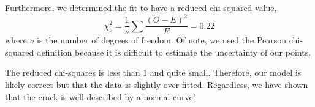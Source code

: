 \documentclass{article}
\begin{document}
Furthermore, we determined the fit to have a reduced chi-squared value,
\begin{equation}
    \chi^{2}_{\nu} = \frac{1}{\nu}\sum{\frac{(O-E)^2}{E}} = 0.22
\end{equation}
where $\nu$ is the number of degrees of freedom. Of note, we used the Pearson chi-squared definition because it is difficult to estimate the uncertainty of our points.

The reduced chi-squares is less than 1 and quite small. Therefore, our model is likely correct but that the
data is slightly over fitted. Regardless, we have shown that the crack is well-described by a normal curve!



\nocite{*}
\end{document}
